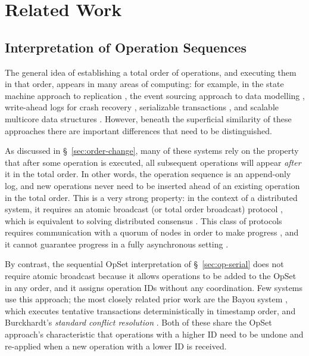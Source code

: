 \section{Related Work}\label{sec:relwork}

\subsection{Interpretation of Operation Sequences}\label{sec:op-sequences}

The general idea of establishing a total order of operations, and executing them in that order, appears in many areas of computing:
for example, in the state machine approach to replication \cite{Schneider:1990vy},
the event sourcing approach to data modelling \cite{Vernon:2013ww},
write-ahead logs for crash recovery \cite{Mohan:1992fe},
serializable transactions \cite{Davidson:1985hv},
and scalable multicore data structures \cite{BoydWickizer:2014uz}.
However, beneath the superficial similarity of these approaches there are important differences that need to be distinguished.

As discussed in \S~\ref{sec:order-change}, many of these systems rely on the property that after some operation is executed, all subsequent operations will appear \emph{after} it in the total order.
In other words, the operation sequence is an append-only log, and new operations never need to be inserted ahead of an existing operation in the total order.
This is a very strong property: in the context of a distributed system, it requires an atomic broadcast (or total order broadcast) protocol \cite{Defago:2004ji}, which is equivalent to solving distributed consensus \cite{Chandra:1996cp}.
This class of protocols requires communication with a quorum of nodes in order to make progress \cite{Howard:2016tz}, and it cannot guarantee progress in a fully asynchronous setting \cite{Fischer:1985tt}.

By contrast, the sequential OpSet interpretation of \S~\ref{sec:op-serial} does not require atomic broadcast because it allows operations to be added to the OpSet in any order, and it assigns operation IDs without any coordination.
Few systems use this approach; the most closely related prior work are the Bayou system \cite{Terry:1995dn}, which executes tentative transactions deterministically in timestamp order, and Burckhardt's \emph{standard conflict resolution} \cite[\S~4.3.3]{Burckhardt:2014hy}.
Both of these share the OpSet approach's characteristic that operations with a higher ID need to be undone and re-applied when a new operation with a lower ID is received.

